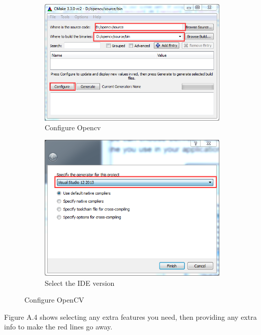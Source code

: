 \begin{enumerate}
\begin{figure}[!h]
\centering
\begin{subfigure}{.55\textwidth}
  \centering
  \includegraphics[scale=0.4]{img/user/cmake}
  \caption{Configure Opencv}
  \label{fig:sub1}
\end{subfigure}%
\begin{subfigure}{.3\textwidth}
  \centering
  \includegraphics[scale =0.4]{img/user/configure}
  \caption{Select the IDE version}
  \label{fig:sub2}
\end{subfigure}
\caption{Configure OpenCV}
\label{fig:test}
\end{figure}


Figure A.4 shows selecting any extra features you need, then providing any extra info to make the red lines go away. \\


\end{enumerate}
